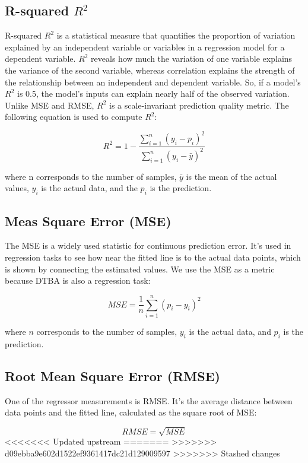 \subsection{R-squared $R^2$ }
R-squared $R^2$ is a statistical measure that quantifies the proportion of variation explained by an independent variable or variables in a regression model for a dependent variable. $R^2$ reveals how much the variation of one variable explains the variance of the second variable, whereas correlation explains the strength of the relationship between an independent and dependent variable. So, if a model's $R^2$ is 0.5, the model's inputs can explain nearly half of the observed variation. Unlike MSE and RMSE, $R^2$ is a scale-invariant prediction quality metric. The following equation is used to compute $R^2$:

\begin{equation}
    R^2 = 1 - \frac{\sum_{i=1}^{n} (y_i - p_i)^{2}}{\sum_{i=1}^{n} (y_i - \bar{y})^{2}}
\end{equation}

where n corresponds to the number of samples, $\bar{y}$ is the mean of the actual values, $y_i$ is the actual data, and the $p_i$ is the prediction.

\subsection{Meas Square Error (MSE)}
The MSE is a widely used statistic for continuous prediction error. It's used in regression tasks to see how near the fitted line is to the actual data points, which is shown by connecting the estimated values. We use the MSE as a metric because DTBA is also a regression task:

\begin{equation}
    MSE = \frac{1}{n}\sum_{i=1}^{n} (p_i - y_i)^{2}
\end{equation}

where $n$ corresponds to the number of samples, $y_i$ is the actual data, and $p_i$ is the prediction. 

\subsection{Root Mean Square Error (RMSE)}
One of the regressor measurements is RMSE. It's the average distance between data points and the fitted line, calculated as the square root of MSE:

\begin{equation}
    RMSE = \sqrt{MSE}
\end{equation}
<<<<<<< Updated upstream
=======
>>>>>>> d09ebba9e602d1522ef9361417dc21d129009597
>>>>>>> Stashed changes
